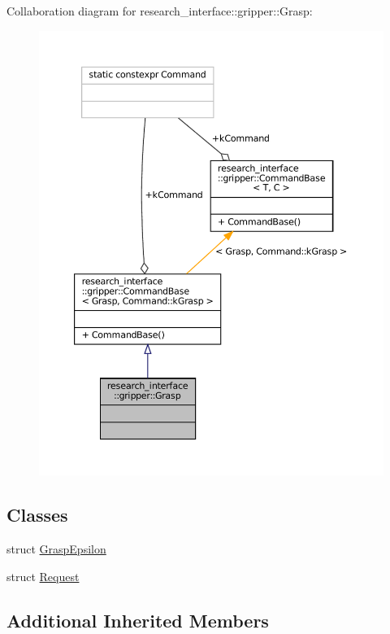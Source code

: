 Collaboration diagram for research\+\_\+interface\+:\+:gripper\+:\+:Grasp\+:
\nopagebreak
\begin{figure}[H]
\begin{center}
\leavevmode
\includegraphics[width=350pt]{structresearch__interface_1_1gripper_1_1Grasp__coll__graph}
\end{center}
\end{figure}
\subsection*{Classes}
\begin{DoxyCompactItemize}
\item 
struct \hyperlink{structresearch__interface_1_1gripper_1_1Grasp_1_1GraspEpsilon}{Grasp\+Epsilon}
\item 
struct \hyperlink{structresearch__interface_1_1gripper_1_1Grasp_1_1Request}{Request}
\end{DoxyCompactItemize}
\subsection*{Additional Inherited Members}


